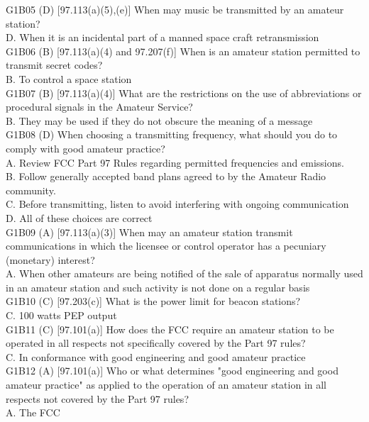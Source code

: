 \documentclass[12pt,letterpaper]{report}
\begin{document}
G1B05 (D) [97.113(a)(5),(e)] When may music be transmitted by an amateur station?\\
D. When it is an incidental part of a manned space craft retransmission\\

G1B06 (B) [97.113(a)(4) and 97.207(f)] When is an amateur station permitted to transmit secret codes?\\
B. To control a space station\\

G1B07 (B) [97.113(a)(4)] What are the restrictions on the use of abbreviations or procedural signals in the Amateur Service?\\
B. They may be used if they do not obscure the meaning of a message\\

G1B08 (D) When choosing a transmitting frequency, what should you do to comply with good amateur practice?\\
A. Review FCC Part 97 Rules regarding permitted frequencies and emissions.\\
B. Follow generally accepted band plans agreed to by the Amateur Radio community.\\
C. Before transmitting, listen to avoid interfering with ongoing communication\\
D. All of these choices are correct\\

G1B09 (A) [97.113(a)(3)] When may an amateur station transmit communications in which the licensee or control operator has a pecuniary (monetary) interest?\\
A. When other amateurs are being notified of the sale of apparatus normally used in an amateur station and such activity is not done on a regular basis\\

G1B10 (C) [97.203(c)] What is the power limit for beacon stations?\\
C. 100 watts PEP output\\

G1B11 (C) [97.101(a)] How does the FCC require an amateur station to be operated in all respects not specifically covered by the Part 97 rules?\\
C. In conformance with good engineering and good amateur practice\\

G1B12 (A) [97.101(a)] Who or what determines "good engineering and good amateur practice" as applied to the operation of an amateur station in all respects not covered by the Part 97 rules?\\
A. The FCC\\
\end{document}
